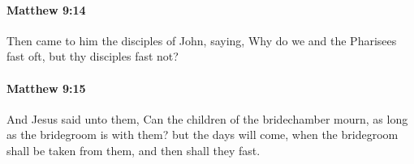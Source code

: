 		\paragraph{Matthew 9:14} %
			\label{MATTHEW-9-14}

			Then came to him the disciples of John, saying, Why do we and the Pharisees fast oft, but thy disciples fast not?

			\begin{framed}
			\scriptsize
				\begin{compactdesc}
					\item[SBLG] 
				\end{compactdesc}
			\end{framed}

		\paragraph{Matthew 9:15} %
			\label{MATTHEW-9-15}

			And Jesus said unto them, Can the children of the bridechamber mourn, as long as the bridegroom is with them? but the days will come, when the bridegroom shall be taken from them, and then shall they fast.

